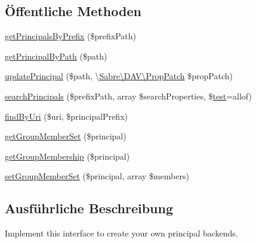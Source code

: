 \subsection*{Öffentliche Methoden}
\begin{DoxyCompactItemize}
\item 
\mbox{\hyperlink{interface_sabre_1_1_d_a_v_a_c_l_1_1_principal_backend_1_1_backend_interface_a8f5e0aa27706302146b96b9d09bbe195}{get\+Principals\+By\+Prefix}} (\$prefix\+Path)
\item 
\mbox{\hyperlink{interface_sabre_1_1_d_a_v_a_c_l_1_1_principal_backend_1_1_backend_interface_a4b8eee5240e1518738c8774eb8753566}{get\+Principal\+By\+Path}} (\$path)
\item 
\mbox{\hyperlink{interface_sabre_1_1_d_a_v_a_c_l_1_1_principal_backend_1_1_backend_interface_ad724652cb45ac93e85b7a1cab9784b49}{update\+Principal}} (\$path, \textbackslash{}\mbox{\hyperlink{class_sabre_1_1_d_a_v_1_1_prop_patch}{Sabre\textbackslash{}\+D\+A\+V\textbackslash{}\+Prop\+Patch}} \$prop\+Patch)
\item 
\mbox{\hyperlink{interface_sabre_1_1_d_a_v_a_c_l_1_1_principal_backend_1_1_backend_interface_a541dc1b2f8968514abf0a0d1cefd0183}{search\+Principals}} (\$prefix\+Path, array \$search\+Properties, \$\mbox{\hyperlink{classtest}{test}}=\textquotesingle{}allof\textquotesingle{})
\item 
\mbox{\hyperlink{interface_sabre_1_1_d_a_v_a_c_l_1_1_principal_backend_1_1_backend_interface_a949777beae7b9f2478278e080b7abc71}{find\+By\+Uri}} (\$uri, \$principal\+Prefix)
\item 
\mbox{\hyperlink{interface_sabre_1_1_d_a_v_a_c_l_1_1_principal_backend_1_1_backend_interface_adb97d3bf0d019cf48391a0bc1425e0ce}{get\+Group\+Member\+Set}} (\$principal)
\item 
\mbox{\hyperlink{interface_sabre_1_1_d_a_v_a_c_l_1_1_principal_backend_1_1_backend_interface_ac57affc7cfeb292c4262bd555953c372}{get\+Group\+Membership}} (\$principal)
\item 
\mbox{\hyperlink{interface_sabre_1_1_d_a_v_a_c_l_1_1_principal_backend_1_1_backend_interface_a01666fb21db6cf0e1d3c5c43efc0cb50}{set\+Group\+Member\+Set}} (\$principal, array \$members)
\end{DoxyCompactItemize}


\subsection{Ausführliche Beschreibung}
Implement this interface to create your own principal backends.

